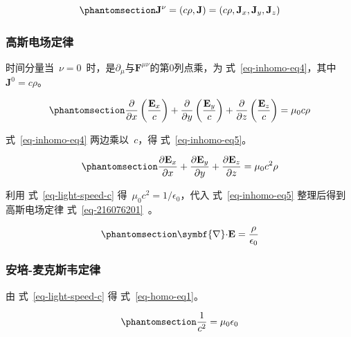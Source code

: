 \documentclass[
  chinese,
  a4paper,
  UTF8,
  12pt,
  oneside,
  openany]{ctexbook}
\begin{document}
\begin{equation}\protect\phantomsection\label{eq-four-current}{
\mathbf{J}^{\nu} = (c\rho, \mathbf{J}) = (c\rho, \mathbf{J}_x, \mathbf{J}_y, \mathbf{J}_z)
}\end{equation}

\subsubsection{高斯电场定律}\label{ux9ad8ux65afux7535ux573aux5b9aux5f8b}

时间分量当~\(\nu = 0\)~时，是\(\partial_{\mu}\)与\(\mathbf{F}^{\mu\nu}\)的第0列点乘，为
式~\ref{eq-inhomo-eq4}，其中~\(\mathbf{J}^{0} = c\rho\)。

\begin{equation}\protect\phantomsection\label{eq-inhomo-eq4}{
\frac{\partial}{\partial x}\left( \frac{\mathbf{E}_{x}}{c} \right) + \frac{\partial}{\partial y}\left( \frac{\mathbf{E}_{y}}{c} \right) + \frac{\partial}{\partial z}\left( \frac{\mathbf{E}_{z}}{c} \right) = \mu_{0}c\rho
}\end{equation}

式~\ref{eq-inhomo-eq4} 两边乘以~\(c\)，得 式~\ref{eq-inhomo-eq5}。

\begin{equation}\protect\phantomsection\label{eq-inhomo-eq5}{
\frac{\partial\mathbf{E}_{x}}{\partial x} + \frac{\partial\mathbf{E}_{y}}{\partial y} + \frac{\partial\mathbf{E}_{z}}{\partial z} = \mu_{0}c^{2}\rho
}\end{equation}

利用 式~\ref{eq-light-speed-c}
得~\(\mu_{0}c^{2} = 1/\epsilon_{0}\)，代入 式~\ref{eq-inhomo-eq5}
整理后得到高斯电场定律 式~\ref{eq-216076201}~。

\begin{equation}\protect\phantomsection\label{eq-216076201}{\symbf{\nabla} \mathbf{\cdot E} = \frac{\rho}{\epsilon_{0}}}\end{equation}

\subsubsection{安培-麦克斯韦定律}\label{ux5b89ux57f9-ux9ea6ux514bux65afux97e6ux5b9aux5f8b}

由 式~\ref{eq-light-speed-c} 得 式~\ref{eq-homo-eq1}。

\begin{equation}\protect\phantomsection\label{eq-homo-eq1}{
\frac{1}{c^{2}} = \mu_{0}\epsilon_{0}
}\end{equation}
\end{document}
